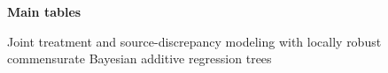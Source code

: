 \documentclass[11pt]{article}
\begin{document}
\begin{center}{\Large\bfseries Main tables}\par\medskip
{Joint treatment and source-discrepancy modeling with locally robust commensurate Bayesian additive regression trees}\end{center}

\clearpage

\clearpage

\clearpage

\end{document}
